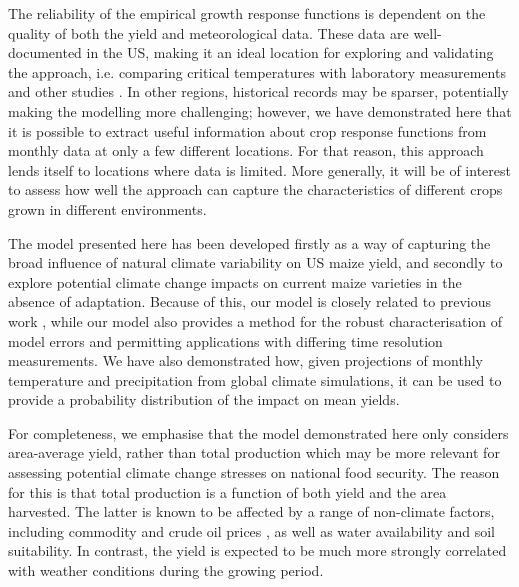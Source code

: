 \documentclass[12pt]{iopart}
\newcommand{\remove}[1]{}
\newcommand{\add}[1]{#1}
\begin{document}
The reliability of the empirical growth response functions is dependent on the quality of both the yield and meteorological data. These data are well-documented in the US, making it an ideal location for exploring and validating the approach, i.e. comparing critical temperatures with laboratory measurements and other studies \citep[e.g.][]{cutforth:1990, schlenker:2009, hatfield:2011, lobell:2013, sanchez:2014}. In other regions, historical records may be sparser, potentially making the modelling more challenging; however, we have demonstrated here that it is possible to extract useful information about crop response functions from monthly data at only a few different locations. For that reason, this approach lends itself to locations where data is limited. More generally, it will be of interest to assess how well the approach can capture the characteristics of different crops grown in different environments.

 

The model presented here has been developed firstly as a way of capturing the broad influence of natural climate variability on US maize yield, and secondly to explore potential climate change impacts on current maize varieties in the absence of adaptation. Because of this, \remove{it}\add{our model} is closely related to previous work \citep[e.g.][]{schlenker:2009, roberts:2012, lobell:2013}, while \remove{it}\add{our model} also provides a method for the robust characterisation of \add{model} errors and permitting applications with differing time resolution measurements. \remove{WE}\add{We} have \add{also} demonstrated how, given projections of monthly temperature and precipitation from global climate simulations, it can be used to provide a probability distribution of the impact on mean yields.

For completeness, we emphasise that the model demonstrated here only considers area-average yield, rather than total production which may be more relevant for assessing potential climate change stresses on national food security. The reason for this is that total production is a function of both yield and the area harvested. The latter is known to be affected by a range of non-climate factors, including commodity and crude oil prices \citep[e.g.][]{Zafeiriou:2018}, as well as water availability and soil suitability. In contrast, the yield is expected to be much more strongly correlated with weather conditions during the growing period.
\end{document}
